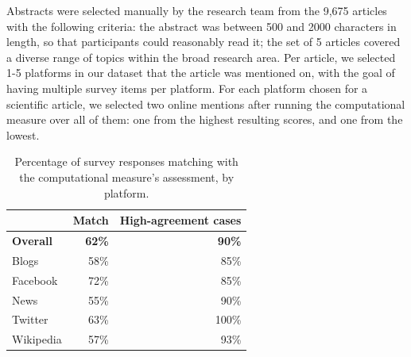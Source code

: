 \documentclass[letterpaper]{article} %
\begin{document}
Abstracts were selected manually by the research team from the 9,675 articles with the following criteria: the abstract was between 500 and 2000 characters in length, so that participants could reasonably read it; the set of 5 articles covered a diverse range of topics within the broad research area.
Per article, we selected 1-5 platforms in our dataset that the article was mentioned on, with the goal of having multiple survey items per platform. For each platform chosen for a scientific article, we selected two online mentions after running the computational measure over all of them: one from the highest resulting scores, and one from the lowest. %

\begin{table}[t]
    \centering
    \begin{tabular}{@{}l|r|r@{}}
     & \textbf{Match} & \textbf{High-agreement cases} \\ \hline
    \textbf{Overall} & \textbf{62\%} & \textbf{90\%} \\ \hline
    {Blogs} & 58\% & 85\%\\ %
    {Facebook} & 72\% & 85\% \\ %
    {News} & 55\% & 90\% \\ %
    {Twitter} & 63\% & 100\% \\ %
    {Wikipedia} & 57\% & 93\% %
    \end{tabular}
    \caption{Percentage of survey responses matching with the computational measure's assessment, by platform.}
    \label{tab:survey_items_platforms}
\end{table}
\end{document}
